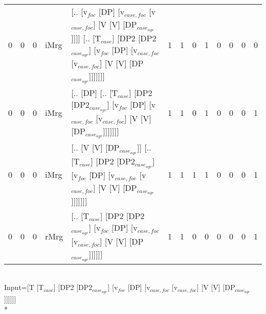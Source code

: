 \begin{tabularx}{\linewidth}{rrrlXrrrrrrrr}
   0 &       0 &   0 & iMrg & [.. [v$_{foc}$ [DP] [v$_{case,foc}$ [v$_{case,foc}$] [V [V] [DP$_{case_{agr}}$]]]] [.. [T$_{case}$] [DP2 [DP2$_{case_{agr}}$] [v$_{foc}$ [DP] [v$_{case,foc}$ [v$_{case,foc}$] [V [V] [DP$_{case_{agr}}$]]]]]]]                      &             1 &             1 &                  0 &            1 &              0 &             0 &              0 &          0 \\
   0 &       0 &   0 & iMrg & [.. [DP] [.. [T$_{case}$] [DP2 [DP2$_{case_{agr}}$] [v$_{foc}$ [DP] [v$_{case,foc}$ [v$_{case,foc}$] [V [V] [DP$_{case_{agr}}$]]]]]]]                                                                              &             1 &             1 &                  0 &            1 &              0 &             0 &              0 &          1 \\
   0 &       0 &   0 & iMrg & [.. [V [V] [DP$_{case_{agr}}$]] [.. [T$_{case}$] [DP2 [DP2$_{case_{agr}}$] [v$_{foc}$ [DP] [v$_{case,foc}$ [v$_{case,foc}$] [V [V] [DP$_{case_{agr}}$]]]]]]]                                                             &             1 &             1 &                  1 &            1 &              0 &             0 &              0 &          1 \\
   0 &       0 &   0 & rMrg & [.. [T$_{case}$] [DP2 [DP2$_{case_{agr}}$] [v$_{foc}$ [DP] [v$_{case,foc}$ [v$_{case,foc}$] [V [V] [DP$_{case_{agr}}$]]]]]]                                                                                        &             1 &             1 &                  0 &            0 &              0 &             0 &              0 &          1 \\
\hline
\end{tabularx}\endgroup\\
\begingroup\scriptsize Input=[T [T$_{case}$] [DP2 [DP2$_{case_{agr}}$] [v$_{foc}$ [DP] [v$_{case,foc}$ [v$_{case,foc}$] [V [V] [DP$_{case_{agr}}$]]]]]]\\*

